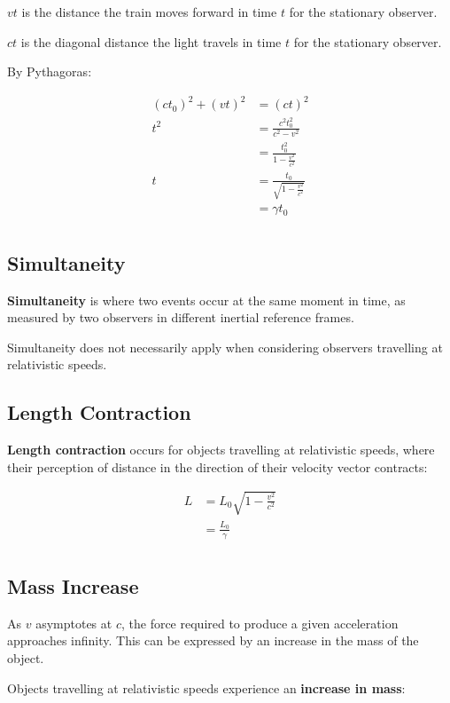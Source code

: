 \documentclass[a4paper,11pt]{report}
\begin{document}
$vt$ is the distance the train moves forward in time $t$ for the stationary
observer.

$ct$ is the diagonal distance the light travels in time $t$ for the stationary
observer.

By Pythagoras:

$$
\begin{aligned}
(ct_0)^2 + (vt)^2 & = (ct)^2 \\
t^2 & = \frac{c^2t_0^2}{c^2 - v^2} \\
& = \frac{t_0^2}{1 - \frac{v^2}{c^2}} \\
t & = \frac{t_0}{\sqrt{1 - \frac{v^2}{c^2}}} \\
& = \gamma t_0 \\
\end{aligned}
$$

\subsection{Simultaneity}

\textbf{Simultaneity} is where two events occur at the same moment in time, as
measured by two observers in different inertial reference frames.

Simultaneity does not necessarily apply when considering observers travelling
at relativistic speeds.

\subsection{Length Contraction}

\textbf{Length contraction} occurs for objects travelling at relativistic
speeds, where their perception of distance in the direction of their velocity
vector contracts:

$$
\begin{aligned}
L & = L_0 \sqrt{1 - \frac{v^2}{c^2}} \\
& = \frac{L_0}{\gamma} \\
\end{aligned}
$$

\subsection{Mass Increase}

As $v$ asymptotes at $c$, the force required to produce a given acceleration
approaches infinity. This can be expressed by an increase in the mass of the
object.

Objects travelling at relativistic speeds experience an \textbf{increase in
mass}:
\end{document}

